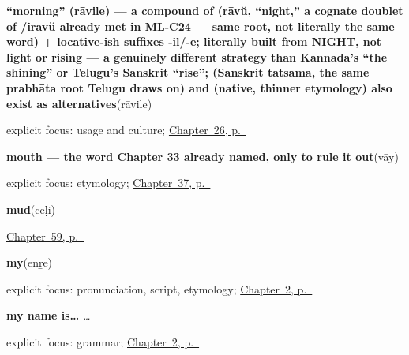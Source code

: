 \noindent\begin{minipage}[t]{\linewidth}
\raggedright
\textbf{\textquotedblleft{}morning\textquotedblright{} (rāvile) — a compound of  (rāvŭ, \textquotedblleft{}night,\textquotedblright{} a cognate doublet of /iravŭ already met in ML-C24 — same root, not literally the same word) + locative-ish suffixes -il/-e; literally built from NIGHT, not light or rising — a genuinely different strategy than Kannada's \textquotedblleft{}the shining\textquotedblright{} or Telugu's Sanskrit \textquotedblleft{}rise\textquotedblright{};  (Sanskrit tatsama, the same prabhāta root Telugu draws on) and  (native, thinner etymology) also exist as alternatives}\enspace\emph{}\enspace(rāvile)\par
\footnotesize explicit focus: usage and culture; \hyperref[ch:ml-morning]{Chapter~26, p.~\pageref*{ch:ml-morning}}
\end{minipage}\par\smallskip

\noindent\begin{minipage}[t]{\linewidth}
\raggedright
\textbf{mouth — the word Chapter 33 already named, only to rule it out}\enspace\emph{}\enspace(vāy)\par
\footnotesize explicit focus: etymology; \hyperref[ch:ml-face-words]{Chapter~37, p.~\pageref*{ch:ml-face-words}}
\end{minipage}\par\smallskip

\noindent\begin{minipage}[t]{\linewidth}
\raggedright
\textbf{mud}\enspace\emph{}\enspace(ceḷi)\par
\footnotesize \hyperref[ch:ml-what-the-air-carries]{Chapter~59, p.~\pageref*{ch:ml-what-the-air-carries}}
\end{minipage}\par\smallskip

\noindent\begin{minipage}[t]{\linewidth}
\raggedright
\textbf{my}\enspace\emph{}\enspace(enṟe)\par
\footnotesize explicit focus: pronunciation, script, etymology; \hyperref[ch:introductions]{Chapter~2, p.~\pageref*{ch:introductions}}
\end{minipage}\par\smallskip

\noindent\begin{minipage}[t]{\linewidth}
\raggedright
\textbf{my name is…}\enspace\emph{  … }\par
\footnotesize explicit focus: grammar; \hyperref[ch:introductions]{Chapter~2, p.~\pageref*{ch:introductions}}
\end{minipage}\par\smallskip


